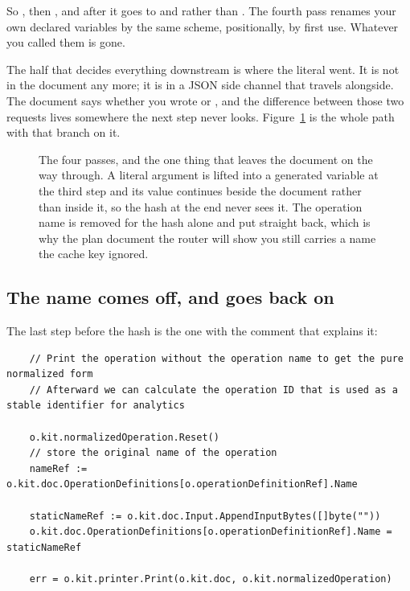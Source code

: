 So , then , and after  it goes to  and
 rather than . The fourth pass renames your own declared
variables by the same scheme, positionally, by first use. Whatever you called
them is gone.

%
The half that decides everything downstream is where the literal went. It is not
in the document any more; it is in a JSON side channel that travels alongside.
The document says  whether you wrote  or , and
the difference between those two requests lives somewhere the next step never
looks. Figure~\ref{fig:ch17-normalization-to-key} is the whole path with that
branch on it.

\begin{figure}[htbp]
  \centering
  
  \caption{The four passes, and the one thing that leaves the document on the
  way through. A literal argument is lifted into a generated variable at the
  third step and its value continues beside the document rather than inside it,
  so the hash at the end never sees it. The operation name is removed for the
  hash alone and put straight back, which is why the plan document the router
  will show you still carries a name the cache key ignored.}
  \label{fig:ch17-normalization-to-key}
\end{figure}

\subsection*{The name comes off, and goes back on}

%
The last step before the hash is the one with the comment that explains it:

\begin{verbatim}
	// Print the operation without the operation name to get the pure normalized form
	// Afterward we can calculate the operation ID that is used as a stable identifier for analytics

	o.kit.normalizedOperation.Reset()
	// store the original name of the operation
	nameRef := o.kit.doc.OperationDefinitions[o.operationDefinitionRef].Name

	staticNameRef := o.kit.doc.Input.AppendInputBytes([]byte(""))
	o.kit.doc.OperationDefinitions[o.operationDefinitionRef].Name = staticNameRef

	err = o.kit.printer.Print(o.kit.doc, o.kit.normalizedOperation)
\end{verbatim}

